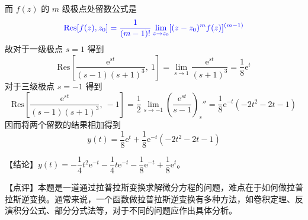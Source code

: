 \documentclass[UTF8]{ctexart}
\newcommand\e{\mathrm{e}}
\begin{document}
而 $f(z)$ 的 $m$ 级极点处留数公式是
\begin{equation}\color{blue}
    \mathrm{Res}[f(z),z_0] = \dfrac{1}{(m-1)!} \lim\limits_{z\to z_0} [(z-z_0)^m f(z)]^{(m-1)}
\end{equation}
故对于一级极点 $s=1$ 得到
\begin{equation*}
    \mathrm{Res}\left[\dfrac{\e^{st}}{(s-1)(s+1)^3},\ 1 \right] = \lim\limits_{s\to 1} \dfrac{\e^{st}}{(s+1)^3} = \dfrac18 \e^{t}
\end{equation*}
对于三级极点 $s=-1$ 得到
\begin{equation*}
    \mathrm{Res}\left[\dfrac{\e^{st}}{(s-1)(s+1)^3},\ -1 \right] = \dfrac12\lim\limits_{s\to -1} \left(\dfrac{\e^{st}}{s-1}\right)_s'' = \dfrac18\e^{-t}(-2t^2 -2t -1)
\end{equation*}
因而将两个留数的结果相加得到
\begin{equation*}
    y(t) = \dfrac18\e^t + \dfrac18\e^{-t}(-2t^2 -2t -1)
\end{equation*}

\textcolor{cyan!80!black}{【结论】$y(t) = -\dfrac14 t^2 \e^{-t} - \dfrac14 t\e^{-t} - \dfrac18 \e^{-t} + \dfrac18 \e^t$。}

\vspace{0.3cm}

\textcolor{cyan!80!black}{【点评】本题是一道通过拉普拉斯变换求解微分方程的问题，难点在于如何做拉普拉斯逆变换。通常来说，一个函数做拉普拉斯逆变换有多种方法，如卷积定理、反演积分公式、部分分式法等，对于不同的问题应作出具体分析。}
\end{document}
